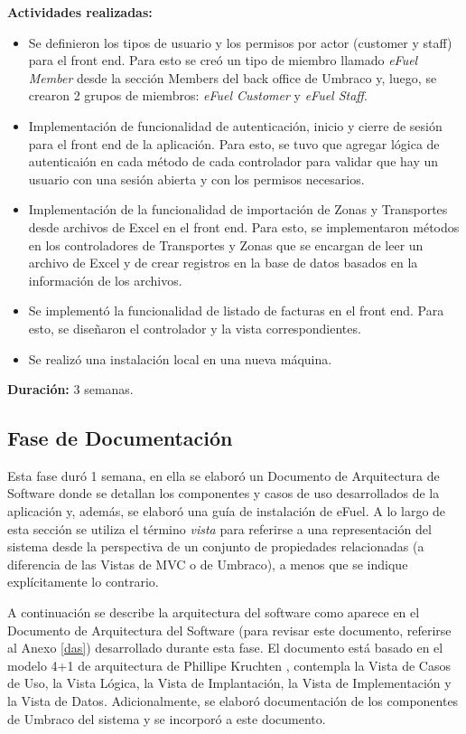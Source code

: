 \vspace{0.3cm}
\textbf{Actividades realizadas:}
\begin{itemize}
    \item Se definieron los tipos de usuario y los permisos por actor (customer y staff) para el front end. Para esto se creó un tipo de miembro llamado \emph{eFuel Member} desde la sección Members del back office de Umbraco y, luego, se crearon 2 grupos de miembros: \emph{eFuel Customer} y \emph{eFuel Staff}.
    \item Implementación de funcionalidad de autenticación, inicio y cierre de sesión para el front end de la aplicación. Para esto, se tuvo que agregar lógica de autenticaión en cada método de cada controlador para validar que hay un usuario con una sesión abierta y con los permisos necesarios.
    \item Implementación de la funcionalidad de importación de Zonas y Transportes desde archivos de Excel en el front end. Para esto, se implementaron métodos en los controladores de Transportes y Zonas que se encargan de leer un archivo de Excel y de crear registros en la base de datos basados en la información de los archivos.
    \item Se implementó la funcionalidad de listado de facturas en el front end. Para esto, se diseñaron el controlador y la vista correspondientes.
    \item Se realizó una instalación local en una nueva máquina.
\end{itemize}

\textbf{Duración:} 3 semanas.

\subsection{Fase de Documentación} \label{documentation}
Esta fase duró 1 semana, en ella se elaboró un Documento de Arquitectura de Software donde se detallan los componentes y casos de uso desarrollados de la aplicación y, además, se elaboró una guía de instalación de eFuel. A lo largo de esta sección se utiliza el término \emph{vista} para referirse a una representación del sistema desde la perspectiva de un conjunto de propiedades relacionadas (a diferencia de las Vistas de MVC o de Umbraco), a menos que se indique explícitamente lo contrario.

A continuación se describe la arquitectura del software como aparece en el Documento de Arquitectura del Software (para revisar este documento, referirse al Anexo \ref{das}) desarrollado durante esta fase. El documento está basado en el modelo 4+1 de arquitectura de Phillipe Kruchten \cite{41Kruchten}, contempla la Vista de Casos de Uso, la Vista Lógica, la Vista de Implantación, la Vista de Implementación y la Vista de Datos. Adicionalmente, se elaboró documentación de los componentes de Umbraco del sistema y se incorporó a este documento.


